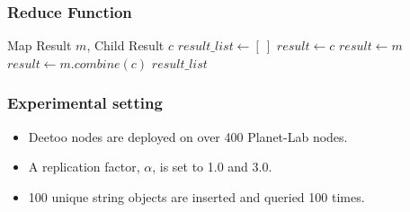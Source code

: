 \documentclass[red]{beamer}
\begin{document}
\begin{frame}
\frametitle{Reduce Function}
\begin{algorithmic}[1]
\REQUIRE Map Result $m$, 
\REQUIRE Child Result $c$
\STATE $result\_list \leftarrow [~]$
  \STATE $result \leftarrow c$
  \STATE $result \leftarrow m$
\ELSE
  \STATE $result \leftarrow m.combine(c)$
\ENDIF
\RETURN $result\_list$
\end{algorithmic}
\end{frame}


\begin{frame}
\frametitle{Experimental setting}
\begin{itemize}
\item Deetoo nodes are deployed on over 400 Planet-Lab nodes. 
\item A replication factor, $\alpha$, is set to 1.0 and 3.0.
\item 100 unique string objects are inserted and queried 100 times.
\end{itemize}
\end{frame}
\end{document}
